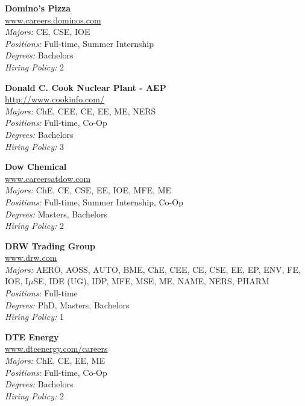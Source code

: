 \documentclass{article}
\begin{document}
\begin{center}
\begin{multicols}{3}
\begin{minipage}{.9\columnwidth}{\Large\bf Domino's Pizza }\\
	\url{www.careers.dominos.com}\\
	\emph{Majors:} CE, CSE, IOE\\
	\emph{Positions:} Full-time, Summer Internship\\
	\emph{Degrees:} Bachelors\\
	\emph{Hiring Policy:} 2\\
\end{minipage}
 
\begin{minipage}{.9\columnwidth}{\Large\bf Donald C. Cook Nuclear Plant - AEP }\\
	\url{http://www.cookinfo.com/}\\
	\emph{Majors:} ChE, CEE, CE, EE, ME, NERS\\
	\emph{Positions:} Full-time, Co-Op\\
	\emph{Degrees:} Bachelors\\
	\emph{Hiring Policy:} 3\\
\end{minipage}
 
\begin{minipage}{.9\columnwidth}{\Large\bf Dow Chemical }\\
	\url{www.careersatdow.com}\\
	\emph{Majors:} ChE, CE, CSE, EE, IOE, MFE, ME\\
	\emph{Positions:} Full-time, Summer Internship, Co-Op\\
	\emph{Degrees:} Masters, Bachelors\\
	\emph{Hiring Policy:} 2\\
\end{minipage}
 
\begin{minipage}{.9\columnwidth}{\Large\bf DRW Trading Group }\\
	\url{www.drw.com}\\
	\emph{Majors:} AERO, AOSS, AUTO, BME, ChE, CEE, CE, CSE, EE, EP, ENV, FE, IOE, I$\mu$SE, IDE (UG), IDP, MFE, MSE, ME, NAME, NERS, PHARM\\
	\emph{Positions:} Full-time\\
	\emph{Degrees:} PhD, Masters, Bachelors\\
	\emph{Hiring Policy:} 1\\
\end{minipage}
 
\begin{minipage}{.9\columnwidth}{\Large\bf DTE Energy }\\
	\url{www.dteenergy.com/careers}\\
	\emph{Majors:} ChE, CE, EE, ME\\
	\emph{Positions:} Full-time, Co-Op\\
	\emph{Degrees:} Bachelors\\
	\emph{Hiring Policy:} 2\\
\end{minipage}
 

\end{multicols}
\end{center}
\end{document}
